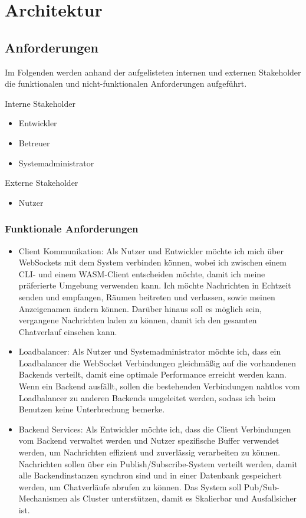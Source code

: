 
\chapter{Architektur}

\section{Anforderungen}

Im Folgenden werden anhand der aufgelisteten internen und externen Stakeholder die funktionalen und nicht-funktionalen Anforderungen aufgeführt.

Interne Stakeholder

\begin{itemize}
  \item Entwickler
  \item Betreuer
  \item Systemadministrator
\end{itemize}

Externe Stakeholder
\begin{itemize}
  \item Nutzer
\end{itemize}

\subsection{Funktionale Anforderungen}
\begin{itemize}
  \item Client Kommunikation: 
    Als Nutzer und Entwickler möchte ich mich über WebSockets mit dem System verbinden können, wobei ich zwischen einem CLI- und einem WASM-Client entscheiden möchte, damit ich meine präferierte Umgebung verwenden kann. Ich möchte Nachrichten in Echtzeit senden und empfangen, Räumen beitreten und verlassen, sowie meinen Anzeigenamen ändern können. Darüber hinaus soll es möglich sein, vergangene Nachrichten laden zu können, damit ich den gesamten Chatverlauf einsehen kann.
  \item Loadbalancer: Als Nutzer und Systemadministrator möchte ich, dass ein Loadbalancer die WebSocket Verbindungen gleichmäßig auf die vorhandenen Backends verteilt, damit eine optimale Performance erreicht werden kann. Wenn ein Backend ausfällt, sollen die bestehenden Verbindungen nahtlos vom Loadbalancer zu anderen Backends umgeleitet werden, sodass ich beim Benutzen keine Unterbrechung bemerke.
  \item Backend Services: Als Entwickler möchte ich, dass die Client Verbindungen vom Backend verwaltet werden und Nutzer spezifische Buffer verwendet werden, um Nachrichten effizient und zuverlässig verarbeiten zu können. Nachrichten sollen über ein Publish/Subscribe-System verteilt werden, damit alle Backendinstanzen synchron sind und in einer Datenbank gespeichert werden, um Chatverläufe abrufen zu können. Das System soll Pub/Sub-Mechanismen als Cluster unterstützen, damit es Skalierbar und Ausfallsicher ist.
\end{itemize}
